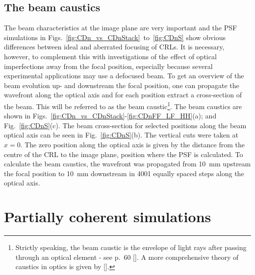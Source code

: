 \begin{refsection}
\subsection{The beam caustics}\label{sec:caustics_sim}

The beam characteristics at the image plane are very important and the PSF simulations in Figs.~\ref{fig:CDn_vs_CDnStack}~to~\ref{fig:CDnS} show obvious differences between ideal and aberrated focusing of CRLs. It is necessary, however, to complement this with investigations of the effect of optical imperfections away from the focal position, especially because several experimental applications may use a defocused beam. To get an overview of the beam evolution up- and downstream the focal position, one can propagate the wavefront along the optical axis and for each position extract a cross-section of the beam. This will be referred to as the beam caustic\footnote{Strictly speaking, the beam caustic is the envelope of light rays after passing through an optical element - see p.~60 [\cite{Lawrence1972}]. A more comprehensive theory of caustics in optics is given by [\cite{Kravstov1999, Nye1999}].}. The beam caustics are shown in Figs.~\ref{fig:CDn_vs_CDnStack}-\ref{fig:CDnFF_LF_HH}(a); and Fig.~\ref{fig:CDnS}(c). The beam cross-section for selected positions along the beam optical axis can be seen in Fig.~\ref{fig:CDnS}(b). The vertical cuts were taken at $x=0$. The zero position along the optical axis is given by the distance from the centre of the CRL to the image plane, position where the PSF is calculated. To calculate the beam caustics, the wavefront was propagated from 10~mm upstream the focal position to 10~mm downstream in 4001 equally spaced steps along the optical axis.

\section{Partially coherent simulations}\label{sec:partcoherent_sim}


\end{refsection}
